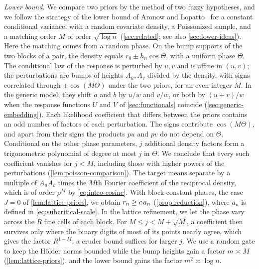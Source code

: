 \emph{Lower bound.} We compare two priors by the method of two fuzzy
hypotheses, and we follow the strategy of the lower bound of Aronow and
Lopatto~\cite{aronowlopatto} for a constant conditional variance, with
a random covariate density, a Poissonized sample, and a matching order
$M$ of order $\sqrt{\log n}$ (\cref{sec:related}; see also \cref{sec:lower-ideas}).
Here the matching comes from a random phase. On the bump supports of the two blocks of a
pair, the density equals $r_0\pm h_n\cos\Theta$, with a uniform phase
$\Theta$. The conditional law of the response is perturbed by $u,v$
and is affine in $(u,v)$; the perturbations are bumps of heights
$A_u,A_v$ divided by the density, with signs correlated through
$\pm\cos(M\Theta)$ under the two priors, for an even integer $M$. In
the generic model, they shift $a$ and $b$ by $u/w$ and $v/w$, or both
by $(u+v)/w$ when the response functions $U$ and $V$ of
\cref{sec:functionals} coincide (\cref{sec:generic-embedding}). Each likelihood
coefficient that differs between the priors contains an odd number of
factors of each perturbation. The signs contribute $\cos(M\Theta)$,
and apart from their signs the products $pu$ and $pv$ do not depend on
$\Theta$. Conditional on the other phase parameters, $j$ additional
density factors form a trigonometric polynomial of degree at most $j$
in $\Theta$. We conclude that every such coefficient vanishes for
$j<M$, including those with higher powers of the perturbations
(\cref{lem:poisson-comparison}). The target means separate by a
multiple of $A_uA_v$ times the $M$th Fourier coefficient of the
reciprocal density, which is of order $\rho^M$ by
\eqref{eq:intro-cosine}. With block-constant phases, the case $J=0$ of
\cref{lem:lattice-priors}, we obtain $r_n\ge c\,a_n$
(\cref{prop:reduction}), where $a_n$ is defined in
\eqref{eq:subcritical-scale}. In the lattice refinement, we let
the phase vary across the $R$ fine cells of each block. For
$M\le j<M+\sqrt M$, a coefficient then survives only where the binary
digits of most of its points nearly agree, which gives the factor
$R^{1-M}$; a cruder bound suffices for larger $j$. We use a random gate to keep
the H\"older norms bounded while the bump heights gain a factor
$m\asymp M$ (\cref{lem:lattice-priors}), and the lower bound gains
the factor $m^2\asymp\log n$.

